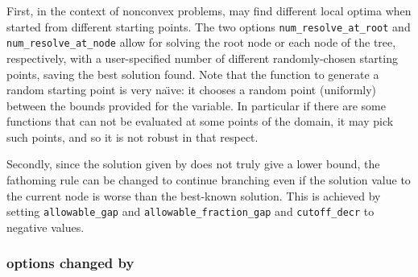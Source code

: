 First, in the context of nonconvex problems, \IPOPT may find different local optima when started
from different starting points. The two options {\tt num\_re\-solve\_at\_root} and {\tt num\_resolve\_at\_node}
allow for solving the root node or each node of the tree, respectively, with a user-specified
number of different randomly-chosen starting points, saving the best solution found.
Note that the function to generate a random starting point is very na\"{\i}ve:
it chooses a random point (uniformly) between the bounds provided for the variable.
In particular if there are some functions that can not be evaluated at some points of the domain, it may pick such points,
and so it is not robust in that respect.

Secondly, since the solution given by \IPOPT does not truly give a lower bound, the fathoming rule can be changed to continue branching even if the solution value to the current node is worse than the best-known solution.
This is achieved by setting {\tt allowable\_gap}
and {\tt allowable\_fraction\_gap} and {\tt cutoff\_decr} to negative values.

\subsubsection{\IPOPT options changed by \BONMIN}

